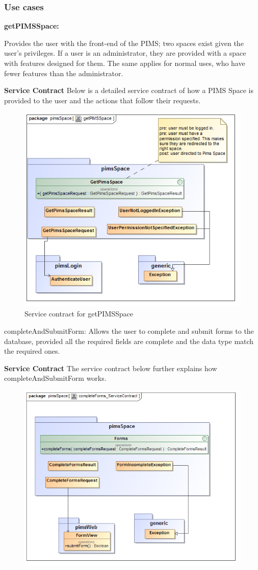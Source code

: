 \subsubsection{Use cases}
\begin{description}
	\item{\textbf{getPIMSSpace:}}
		\begin{description} Provides the user with the front-end of the PIMS; two spaces exist given the user's privileges. If a user is an administrator, they are provided with a space with features designed for them. The same applies for normal uses, who have fewer features than the administrator.
		\item{\textbf{Service Contract}} Below is a detailed service contract of how a PIMS Space is provided to the user and the actions that follow their requests.
		\begin{figure}[H]
			\centerline{\includegraphics[width=0.7\linewidth]{./Functional_Requirements/Graphics/pimsSpace/getPIMSSpace}}
			\caption{Service contract for getPIMSSpace}
		\end{figure}
	\end{description} 
	\item{completeAndSubmitForm:} Allows the user to complete and submit forms to the database, provided all the required fields are complete and the data type match the required ones.
			\begin{description}
		\item{\textbf{Service Contract}} The service contract below further explains how completeAndSubmitForm works.
		\begin{figure}[H]
			\centerline{\includegraphics[width=0.7\linewidth]{./Functional_Requirements/Graphics/pimsSpace/completeForms_ServiceContract}}

\end{figure}
\end{description}
\end{description}
